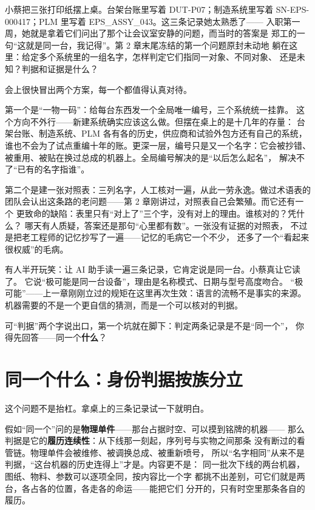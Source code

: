 小蔡把三张打印纸摆上桌。台架台账里写着 DUT-P07；制造系统里写着
SN-EPS-000417；PLM 里写着 EPS\_ASSY\_043。这三条记录她太熟悉了——
入职第一周，她就是拿着它们问出了那个让会议室安静的问题，而当时的答案是
郑工的一句“这就是同一台，我记得”。第 2 章末尾冻结的第一个问题原封未动地
躺在这里：给定多个系统里的一组名字，怎样判定它们指同一对象、不同对象、
还是未知？判据和证据是什么？

会上很快冒出两个方案，每一个都值得认真对待。

第一个是“一物一码”：给每台东西发一个全局唯一编号，三个系统统一挂靠。
这个方向不外行——新建系统确实应该这么做。但摆在桌上的是十几年的存量：
台架台账、制造系统、PLM 各有各的历史，供应商和试验外包方还有自己的系统，
谁也不会为了试点重编十年的账。更深一层，编号只是又一个名字：它会被抄错、
被重用、被贴在换过总成的机器上。全局编号解决的是“以后怎么起名”，
解决不了“已有的名字指谁”。

第二个是建一张对照表：三列名字，人工核对一遍，从此一劳永逸。做过术语表的
团队会认出这条路的老问题——第 2 章刚讲过，对照表自己会繁殖。而它还有一个
更致命的缺陷：表里只有“对上了”三个字，没有对上的理由。谁核对的？凭什么？
哪天有人质疑，答案还是那句“心里都有数”。一张没有证据的对照表，
不过是把老工程师的记忆抄写了一遍——记忆的毛病它一个不少，
还多了一个“看起来很权威”的毛病。

有人半开玩笑：让 AI 助手读一遍三条记录，它肯定说是同一台。小蔡真让它读了。
它说“极可能是同一台设备”，理由是名称模式、日期与型号高度吻合。
“极可能”——上一章刚刚立过的规矩在这里再次生效：语言的流畅不是事实的来源。
机器需要的不是一个更自信的猜测，而是一个可以核对的判据。

可“判据”两个字说出口，第一个坑就在脚下：判定两条记录是不是“同一个”，
你得先回答——同一个\textbf{什么}？

\section{同一个什么：身份判据按族分立}

这个问题不是抬杠。拿桌上的三条记录试一下就明白。

假如“同一个”问的是\textbf{物理单件}——那台占据时空、可以摸到铭牌的机器——
那么判据是它的\textbf{履历连续性}：从下线那一刻起，序列号与实物之间那条
没有断过的看管链。物理单件会被维修、被调换总成、被重新喷号，
所以“名字相同”从来不是判据，“这台机器的历史连得上”才是。内容更不是：
同一批次下线的两台机器，图纸、物料、参数可以逐项全同，按内容比一个字
都挑不出差别，可它们就是两台，各占各的位置，各走各的命运——能把它们
分开的，只有时空里那条各自的履历。


